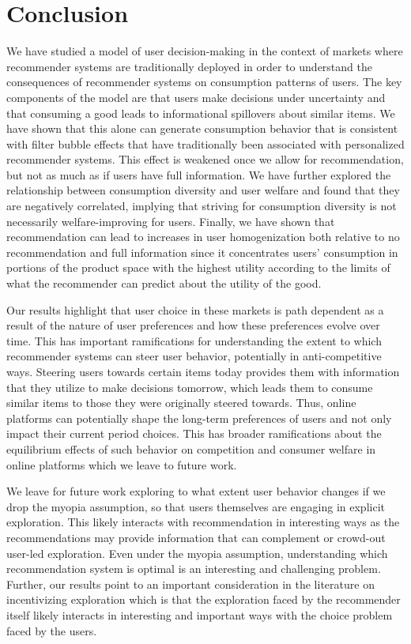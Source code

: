 \documentclass[format=acmsmall, review=false]{acmart}
\begin{document}
\section{Conclusion}
We have studied a model of user decision-making in the context of markets where recommender systems are traditionally deployed in order to understand the consequences of recommender systems on consumption patterns of users. The key components of the model are that users make decisions under uncertainty and that consuming a good leads to informational spillovers about similar items. We have shown that this alone can generate consumption behavior that is consistent with filter bubble effects that have traditionally been associated with personalized recommender systems. This effect is weakened once we allow for recommendation, but not as much as if users have full information. We have further explored the relationship between consumption diversity and user welfare and found that they are negatively correlated, implying that striving for consumption diversity is not necessarily welfare-improving for users. Finally, we have shown that recommendation can lead to increases in user homogenization both relative to no recommendation and full information since it concentrates users' consumption in portions of the product space with the highest utility according to the limits of what the recommender can predict about the utility of the good.
\par 
Our results highlight that user choice in these markets is path dependent as a result of the nature of user preferences and how these preferences evolve over time. This has important ramifications for understanding the extent to which recommender systems can steer user behavior, potentially in anti-competitive ways. Steering users towards certain items today provides them with information that they utilize to make decisions tomorrow, which leads them to consume similar items to those they were originally steered towards. Thus, online platforms can potentially shape the long-term preferences of users and not only impact their current period choices. This has broader ramifications about the equilibrium effects of such behavior on competition and consumer welfare in online platforms which we leave to future work.
\par
We leave for future work exploring to what extent user behavior changes if we drop the myopia assumption, so that users themselves are engaging in explicit exploration. This likely interacts with recommendation in interesting ways as the recommendations may provide information that can complement or crowd-out user-led exploration. Even under the myopia assumption, understanding which recommendation system is optimal is an interesting and challenging problem. Further, our results point to an important consideration in the literature on incentivizing exploration which is that the exploration faced by the recommender itself likely interacts in interesting and important ways with the choice problem faced by the users.
\end{document}
